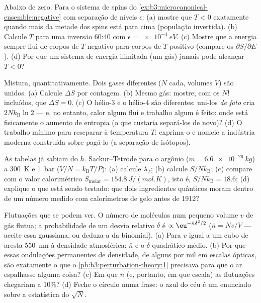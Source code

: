 \begin{exercise}[$\star\star$]\label{exo:b3:microcanonical-ensemble:9}
Abaixo de zero. Para o sistema de spins do
\cref{ex:b3:microcanonical-ensemble:negative} com separação de níveis
$\epsilon$: (a) mostre que $T < 0$ exatamente quando mais da metade dos
spins está para cima (população invertida). (b) Calcule $T$ para uma
inversão 60:40 com $\epsilon = \qty{e-4}{eV}$. (c) Mostre que a energia
sempre flui de corpos de $T$ negativo para corpos de $T$ positivo
(compare os $\partial
S/\partial E$). (d) Por que um sistema de energia
ilimitada (um gás) jamais pode alcançar $T < 0$?
\end{exercise}

\begin{exercise}[$\star\star\star$]\label{exo:b3:microcanonical-ensemble:10}
Mistura, quantitativamente. Dois gases diferentes ($N$ cada, volumes
$V$) são unidos. (a) Calcule $\Delta S$ por contagem. (b) Mesmo gás:
mostre, com os $N!$ incluídos, que $\Delta S = 0$. (c) O hélio-3 e o
hélio-4 são diferentes: uni-los \emph{de fato} cria
$2Nk_{\text{B}}\ln2$ --- e, no entanto, calor algum flui e trabalho
algum é feito: onde está fisicamente o aumento de entropia (o que
custaria separá-los de novo)? (d) O trabalho mínimo para reseparar à
temperatura $T$: exprima-o e nomeie a indústria moderna construída
sobre pagá-lo (a separação de isótopos).
\end{exercise}

\begin{exercise}[$\star\star\star$]\label{exo:b3:microcanonical-ensemble:11}
As tabelas já sabiam do $h$. Sackur--Tetrode para o argônio ($m =
\qty{6.6e-26}{kg}$) a \qty{300}{K} e \qty{1}{bar} ($V/N =
k_{\text{B}}T/P$): (a) calcule $\lambda_T$; (b) calcule $S/N
k_{\text{B}}$; (c) compare com o valor calorimétrico
$S_{\text{molar}} = \qty{154.8}{J/(mol.K)}$, isto é, $S/Nk_{\text{B}}
= 18.6$; (d) explique o que está sendo testado: que
dois ingredientes quânticos moram dentro de um número medido com
calorímetros de gelo antes de 1912?
\end{exercise}

\begin{exercise}[$\star\star\star$]\label{exo:b3:microcanonical-ensemble:12}
Flutuações que se podem ver. O número de moléculas num pequeno volume
$v$ de gás flutua; a probabilidade de um desvio relativo $\delta$ é
$\propto\eu^{-\bar n\delta^2/2}$ ($\bar n = Nv/V$ --- aceite essa
gaussiana, ou deduza-a da binomial). (a) Para $v$ igual a um cubo de
aresta \qty{550}{nm} à densidade atmosférica: $\bar n$ e o $\delta$
quadrático médio. (b) Por que essas ondulações permanentes de densidade,
de alguns por mil em escalas ópticas, são exatamente o que o
\cref{pb:b3:perturbation-theory:1} precisava para que o ar espalhasse
alguma coisa? (c) Em que $\bar n$ (e, portanto, em que escala) as
flutuações chegariam a $10\%$? (d) Feche o círculo numa frase: o azul
do céu é um enunciado sobre a estatística do $\sqrt N$.
\end{exercise}

